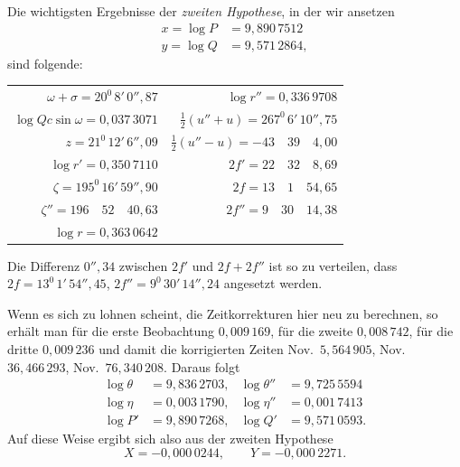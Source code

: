 Die wichtigsten Ergebnisse der \textit{zweiten Hypothese}, in der wir ansetzen
\[
\begin{aligned}
x=\log P&=9{,}890\,7512\\
y=\log Q&=9{,}571\,2864,
\end{aligned}
\]
\noindent sind folgende:
\begin{center}\begingroup\footnotesize\setlength{\tabcolsep}{6pt}\renewcommand{\arraystretch}{1.3}
\begin{tabular}{r|r}
$\omega+\sigma=20^0\,8'\,0''{,}87$ & $\log r''=0{,}336\,9708$\\
$\log Qc\sin\omega=0{,}037\,3071$ & $\tfrac12(u''+u)=267^0\,6'\,10''{,}75$\\
$z=21^0\,12'\,6''{,}09$ & $\tfrac12(u''-u)=-43\quad39\quad4{,}00$\\
$\log r'=0{,}350\,7110$ & $2f'=22\quad32\quad8{,}69$\\
$\zeta=195^0\,16'\,59''{,}90$ & $2f=13\quad1\quad54{,}65$\\
$\zeta''=196\quad52\quad40{,}63$ & $2f''=9\quad30\quad14{,}38$\\
$\log r=0{,}363\,0642$ &
\end{tabular}\endgroup\end{center}
\noindent Die Differenz $0''{,}34$ zwischen $2f'$ und $2f+2f''$ ist so zu verteilen, dass $2f=13^0\,1'\,54''{,}45$, $2f''=9^0\,30'\,14''{,}24$ angesetzt werden.

Wenn es sich zu lohnen scheint, die Zeitkorrekturen hier neu zu berechnen, so erhält man für die erste Beobachtung $0{,}009\,169$, für die zweite $0{,}008\,742$, für die dritte $0{,}009\,236$ und damit die korrigierten Zeiten Nov.\ $5{,}564\,905$, Nov.\ $36{,}466\,293$, Nov.\ $76{,}340\,208$. Daraus folgt
\[
\begin{aligned}
\log\theta&=9{,}836\,2703,&\log\theta''&=9{,}725\,5594\\
\log\eta&=0{,}003\,1790,&\log\eta''&=0{,}001\,7413\\
\log P'&=9{,}890\,7268,&\log Q'&=9{,}571\,0593.
\end{aligned}
\]
\noindent Auf diese Weise ergibt sich also aus der zweiten Hypothese
\[X=-0{,}000\,0244,\qquad Y=-0{,}000\,2271.\]

